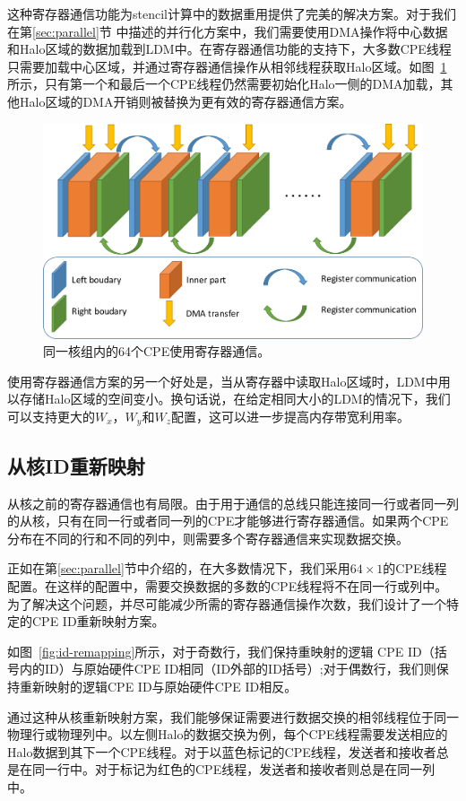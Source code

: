 \documentclass[degree=doctor]{thuthesis}
\begin{document}
这种寄存器通信功能为stencil计算中的数据重用提供了完美的解决方案。对于我们在第\ref{sec:parallel}节
中描述的并行化方案中，我们需要使用DMA操作将中心数据和Halo区域的数据加载到LDM中。在寄存器通信功能的支持下，大多数CPE线程只需要加载中心区域，并通过寄存器通信操作从相邻线程获取Halo区域。如图~\ref{fig:64by1-reg}所示，只有第一个和最后一个CPE线程仍然需要初始化Halo一侧的DMA加载，其他Halo区域的DMA开销则被替换为更有效的寄存器通信方案。


\begin{figure}[ht]
\centering
\includegraphics[width=0.7\columnwidth]{awp_using_register.png}
\caption{同一核组内的64个CPE使用寄存器通信。}
\label{fig:64by1-reg}
\end{figure}

使用寄存器通信方案的另一个好处是，当从寄存器中读取Halo区域时，LDM中用以存储Halo区域的空间变小。换句话说，在给定相同大小的LDM的情况下，我们可以支持更大的$ W_x $，$ W_y $和$ W_z $配置，这可以进一步提高内存带宽利用率。

\subsection{从核ID重新映射}

从核之前的寄存器通信也有局限。由于用于通信的总线只能连接同一行或者同一列的从核，只有在同一行或者同一列的CPE才能够进行寄存器通信。如果两个CPE分布在不同的行和不同的列中，则需要多个寄存器通信来实现数据交换。

正如在第\ref{sec:parallel}节中介绍的，在大多数情况下，我们采用$ 64 \times1 $的CPE线程配置。在这样的配置中，需要交换数据的多数的CPE线程将不在同一行或列中。为了解决这个问题，并尽可能减少所需的寄存器通信操作次数，我们设计了一个特定的CPE ID重新映射方案。

如图~\ref{fig:id-remapping}所示，对于奇数行，我们保持重映射的逻辑 CPE ID（括号内的ID）与原始硬件CPE ID相同（ID外部的ID括号）;对于偶数行，我们则保持重新映射的逻辑CPE ID与原始硬件CPE ID相反。

通过这种从核重新映射方案，我们能够保证需要进行数据交换的相邻线程位于同一物理行或物理列中。以左侧Halo的数据交换为例，每个CPE线程需要发送相应的Halo数据到其下一个CPE线程。对于以蓝色标记的CPE线程，发送者和接收者总是在同一行中。对于标记为红色的CPE线程，发送者和接收者则总是在同一列中。
\end{document}
